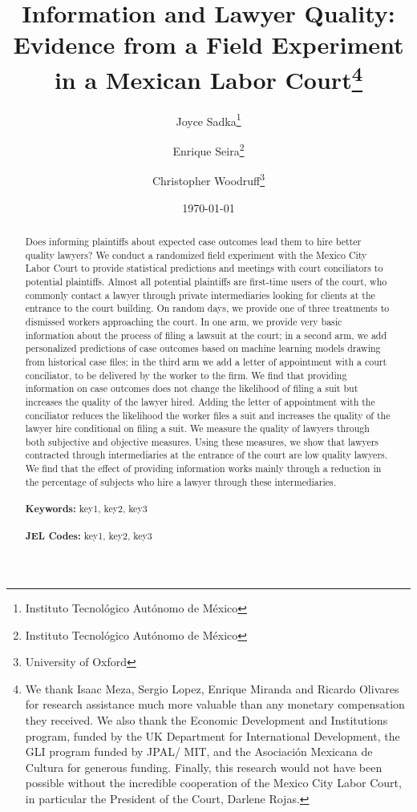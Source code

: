 \documentclass[12 pt]{article}
\begin{document}
\begin{titlepage}
\title{Information and Lawyer Quality: Evidence from a Field Experiment in a Mexican Labor Court\thanks{We thank Isaac Meza, Sergio Lopez, Enrique Miranda and Ricardo Olivares for research assistance much more valuable than any monetary compensation they received. We also thank the Economic Development and Institutions program, funded by the UK Department for International Development, the GLI program funded by JPAL/ MIT, and the Asociación Mexicana de Cultura for generous funding. Finally, this research would not have been possible without the incredible cooperation of the Mexico City Labor Court, in particular the President of the Court, Darlene Rojas.}}
\author{Joyce Sadka\thanks{Instituto Tecnológico Autónomo de México} \and Enrique Seira\thanks{Instituto Tecnológico Autónomo de México} \and Christopher Woodruff\thanks{University of Oxford}}
\date{\today}
\maketitle
\begin{abstract}
\noindent Does informing plaintiffs about expected case outcomes lead them to hire better quality lawyers? We conduct a randomized field experiment with the Mexico City Labor Court to provide statistical predictions and meetings with court conciliators to potential plaintiffs. Almost all potential plaintiffs are first-time users of the court, who commonly contact a lawyer through private intermediaries looking for clients at the entrance to the court building. On random days, we provide one of three treatments to dismissed workers approaching the court. In one arm, we provide very basic information about the process of filing a lawsuit at the court; in a second arm, we add personalized predictions of case outcomes based on machine learning models drawing from historical case files; in the third arm we add a letter of appointment with a court conciliator, to be delivered by the worker to the firm. We find that providing information on case outcomes does not change the likelihood of filing a suit but increases the quality of the lawyer hired. Adding the letter of appointment with the conciliator reduces the likelihood the worker files a suit and increases the quality of the lawyer hire conditional on filing a suit. We measure the quality of lawyers through both subjective and objective measures. Using these measures, we show that lawyers contracted through intermediaries at the entrance of the court are low quality lawyers. We find that the effect of providing information works mainly through a reduction in the percentage of subjects who hire a lawyer through these intermediaries.\\
\vspace{0in}\\
\noindent\textbf{Keywords:} key1, key2, key3\\
\vspace{0in}\\
\noindent\textbf{JEL Codes:} key1, key2, key3\\

\bigskip
\end{abstract}
\setcounter{page}{0}
\thispagestyle{empty}
\end{titlepage}
\end{document}
